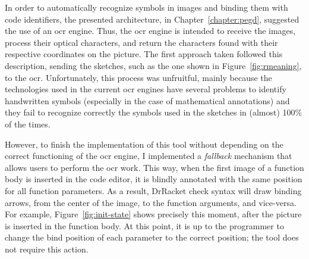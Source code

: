 \begin{figure}[!h]
\begin{minipage}[t]{.495\textwidth}
  \label{fig:collapsed}
\end{minipage}
\end{figure}


In order to automatically recognize symbols in images and binding them with code identifiers, the presented architecture, in Chapter~\ref{chapter:pegd}, suggested the use of an \gls{ocr} engine. Thus, the \gls{ocr} engine is intended to receive the images, process their optical characters, and return the characters found with their respective coordinates on the picture. The first approach taken followed this description, sending the sketches, such as the one shown in Figure~\ref{fig:rmeaning}, to the \gls{ocr}. Unfortunately, this process was unfruitful, mainly because the technologies used in the current \gls{ocr} engines have several problems to identify handwritten symbols (especially in the case of mathematical annotations) and they fail to recognize correctly the symbols used in the sketches in (almost) 100\% of the times.

However, to finish the implementation of this tool without depending on the correct functioning of the \gls{ocr} engine, I implemented a \textit{fallback} mechanism that allows users to perform the \gls{ocr} work. This way, when the first image of a function body is inserted in the code editor, it is blindly annotated with the same position for all function parameters. As a result, DrRacket check syntax will draw binding arrows, from the center of the image, to the function arguments, and vice-versa. For example, Figure~\ref{fig:init-state} shows precisely this moment, after the picture is inserted in the function body. At this point, it is up to the programmer to change the bind position of each parameter to the correct position; the tool does not require this action. 

